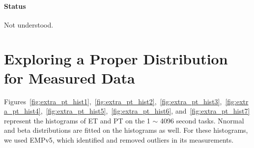\documentclass[10pt]{article}
\begin{document}
\paragraph{Status} Not understood.
%
%
%
%
\vspace{-0.01in}

\newpage

\section{Exploring a Proper Distribution for Measured Data}

Figures~\ref{fig:extra_pt_hist1},~\ref{fig:extra_pt_hist2},~\ref{fig:extra_pt_hist3},~\ref{fig:extra_pt_hist4},~\ref{fig:extra_pt_hist5},~\ref{fig:extra_pt_hist6}, 
and~\ref{fig:extra_pt_hist7} represent the histograms of ET and PT on the 1 $\sim$ 4096 second tasks. 
Nnormal and beta distributions are fitted on the histograms as well.
For these histograms, we used EMPv5, which identified and removed outliers in its measurements.
\end{document}
